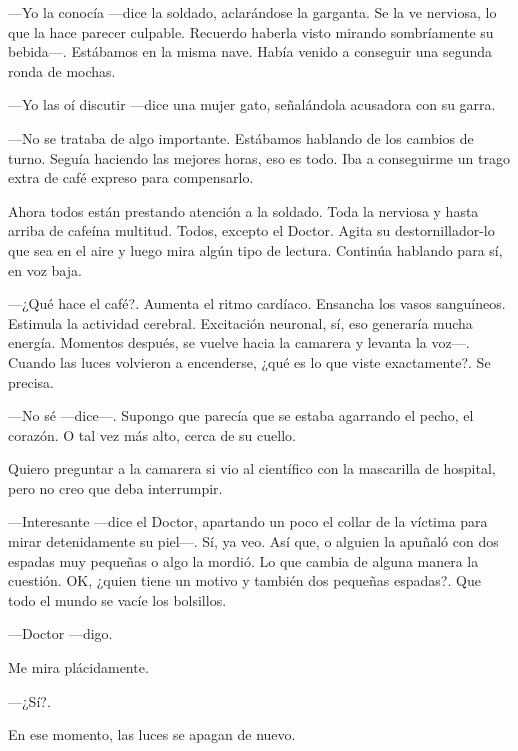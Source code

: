 ---Yo la conocía ---dice la soldado, aclarándose la garganta. Se la ve
nerviosa, lo que la hace parecer culpable. Recuerdo haberla visto
mirando sombríamente su bebida---. Estábamos en la misma nave. Había
venido a conseguir una segunda ronda de mochas.

---Yo las oí discutir ---dice una mujer gato, señalándola acusadora con
su garra.

---No se trataba de algo importante. Estábamos hablando de los cambios
de turno. Seguía haciendo las mejores horas, eso es todo. Iba a
conseguirme un trago extra de café expreso para compensarlo.

Ahora todos están prestando atención a la soldado. Toda la nerviosa y
hasta arriba de cafeína multitud. Todos, excepto el Doctor. Agita su
destornillador-lo que sea en el aire y luego mira algún tipo de
lectura. Continúa hablando para sí, en voz baja.

---¿Qué hace el café?. Aumenta el ritmo cardíaco. Ensancha los vasos
sanguíneos. Estimula la actividad cerebral. Excitación neuronal, sí, eso
generaría mucha energía. Momentos después, se vuelve hacia la camarera y
levanta la voz---. Cuando las luces volvieron a encenderse, ¿qué es lo
que viste exactamente?. Se precisa.

---No sé ---dice---. Supongo que parecía que se estaba agarrando el
pecho, el corazón. O tal vez más alto, cerca de su cuello.

Quiero preguntar a la camarera si vio al científico con la mascarilla de
hospital, pero no creo que deba interrumpir.

---Interesante ---dice el Doctor, apartando un poco el collar de la
víctima para mirar detenidamente su piel---. Sí, ya veo. Así que, o
alguien la apuñaló con dos espadas muy pequeñas o algo la mordió. Lo que
cambia de alguna manera la cuestión. OK, ¿quien tiene un motivo y
también dos pequeñas espadas?. Que todo el mundo se vacíe los bolsillos.

---Doctor ---digo.

Me mira plácidamente. 

---¿Sí?.

En ese momento, las luces se apagan de nuevo.